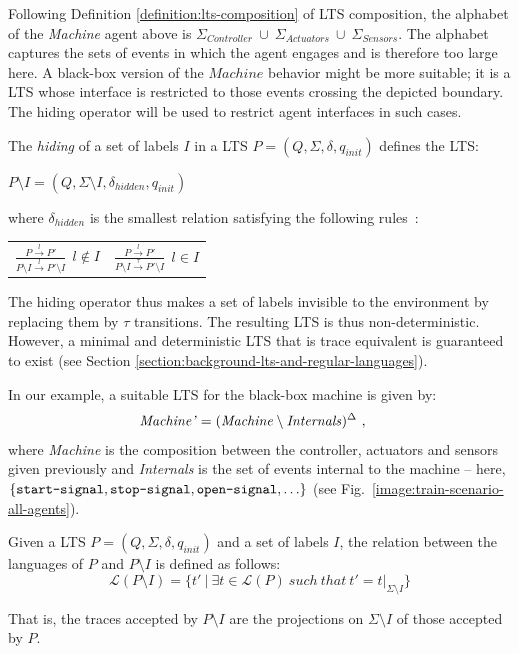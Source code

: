 Following Definition \ref{definition:lts-composition} of LTS composition, the alphabet of the \emph{Machine} agent above is $\Sigma_{Controller}~\cup~\Sigma_{Actuators}~\cup~\Sigma_{Sensors}$. The alphabet captures the sets of events in which the agent engages and is therefore too large here. A black-box version of the $Machine$ behavior might be more suitable; it is a LTS whose interface is restricted to those events crossing the depicted boundary. The hiding operator will be used to restrict agent interfaces in such cases.

\begin{definition}
The \emph{hiding} of a set of labels $I$ in a LTS $P = (Q,\Sigma,\delta,q_{init})$ defines the LTS:
\begin{center}
$P \setminus I = (Q,\Sigma \setminus I,\delta_{hidden},q_{init})$
\end{center}
\noindent where $\delta_{hidden}$ is the smallest relation satisfying the following rules~\cite{Giannakopoulou:1999}:
\end{definition}

\begin{center}
\begin{tabular}{cc}
$\frac{\displaystyle P \stackrel{l}{\longrightarrow} P'}{\displaystyle P \setminus I \stackrel{l}{\longrightarrow} P' \setminus I}~~l \notin I$ & 
$\frac{\displaystyle P \stackrel{l}{\longrightarrow} P'}{\displaystyle P \setminus I \stackrel{\tau}{\longrightarrow} P' \setminus I}~~l \in I$ \\
\end{tabular}
\end{center}

The hiding operator thus makes a set of labels invisible to the environment by replacing them by $\tau$ transitions. The resulting LTS is thus non-deterministic. However, a minimal and deterministic LTS that is trace equivalent is guaranteed to exist (see Section \ref{section:background-lts-and-regular-languages}). 

In our example, a suitable LTS for the black-box machine is given by:
\begin{align*}
\mbox{\emph{Machine'}} &= (\mbox{\emph{Machine}} \setminus \mbox{\emph{Internals}})^\Delta~,
\end{align*}
where \emph{Machine} is the composition between the controller, actuators and sensors given previously and \emph{Internals} is the set of events internal to the machine -- here, $\{\texttt{start-signal}, \texttt{stop-signal}, \texttt{open-signal}, \ldots\}$ (see Fig.~\ref{image:train-scenario-all-agents}).

Given a LTS $P = (Q,\Sigma,\delta,q_{init})$ and a set of labels $I$, the relation between the languages of $P$ and $P \setminus I$ is defined as follows:
\begin{equation*}
\mathcal{L}(P \setminus I) = \{ t'~|~\exists t \in \mathcal{L}(P)~such~that~t' = t|_{\Sigma \setminus I}\}
\end{equation*}

That is, the traces accepted by $P \setminus I$ are the projections on $\Sigma \setminus I$ of those accepted by $P$.
